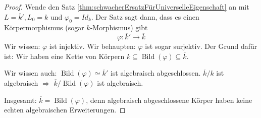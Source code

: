 \documentclass[a4paper,12pt,numbers=noenddot,parskip=full]{scrartcl}
\theoremstyle{dotless}
\theoremstyle{remark}
\begin{document}
	\begin{proof}
		Wende den Satz \ref{thm:schwacherErsatzFürUniverselleEigenschaft} an mit $L = \overline{k}', L_0 = k$ und $\varphi_0 = Id_k$. Der Satz sagt dann, dass es einen Körpermorphismus (sogar $k$-Morphismus) gibt
		\begin{equation*}
			\varphi: \overline{k}' \to \overline{k}
		\end{equation*}
		Wir wissen: $\varphi$ ist injektiv. Wir behaupten: $\varphi$ ist sogar surjektiv. Der Grund dafür ist: Wir haben eine Kette von Körpern $k \subseteq \operatorname{Bild}(\varphi) \subseteq \overline{k}$.
		
		Wir wissen auch: $\operatorname{Bild}(\varphi) \simeq \overline{k}'$ ist algebraisch abgeschlossen. $\overline{k}/k$ ist algebraisch $\Rightarrow$ $\overline{k} / \operatorname{Bild}(\varphi)$ ist algebraisch.
		
		Insgesamt: $\overline{k} = \operatorname{Bild}(\varphi)$, denn algebraisch abgeschlossene Körper haben keine echten algebraischen Erweiterungen.
	\end{proof}
\end{document}
